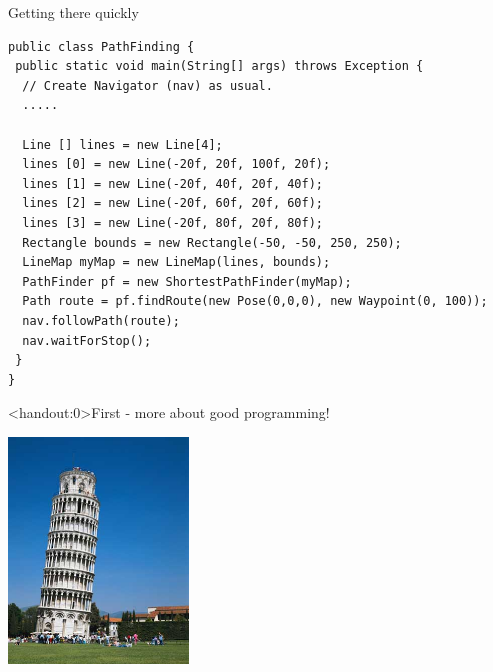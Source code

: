 \documentclass[color=pdftex,usenames,dvipsnames, aspectratio=169]{beamer}
\begin{document}
\begin{frame}[fragile]{Getting there quickly}
\begin{lstlisting}[emph={bounds, myMap, pf, route, nav}, basicstyle=\ttfamily\scriptsize\color{blue}]
public class PathFinding {
 public static void main(String[] args) throws Exception {
  // Create Navigator (nav) as usual.
  .....

  Line [] lines = new Line[4];
  lines [0] = new Line(-20f, 20f, 100f, 20f);
  lines [1] = new Line(-20f, 40f, 20f, 40f);
  lines [2] = new Line(-20f, 60f, 20f, 60f);
  lines [3] = new Line(-20f, 80f, 20f, 80f);
  Rectangle bounds = new Rectangle(-50, -50, 250, 250);
  LineMap myMap = new LineMap(lines, bounds);
  PathFinder pf = new ShortestPathFinder(myMap);
  Path route = pf.findRoute(new Pose(0,0,0), new Waypoint(0, 100));
  nav.followPath(route);
  nav.waitForStop();
 }
}
\end{lstlisting}
\end{frame}




\begin{frame}<handout:0>{First - more about good programming!}

\begin{center}
\includegraphics[height=6cm]{Images/pisa.jpg}
\end{center}
\end{frame}
\end{document}
